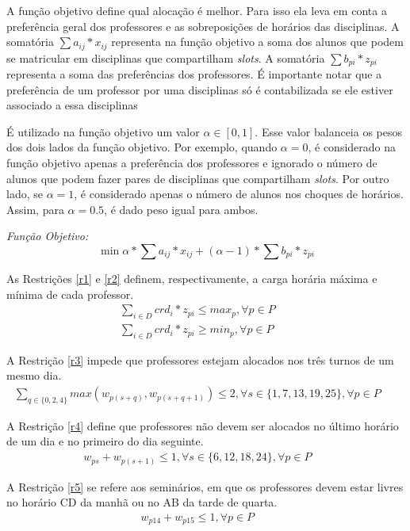 A função objetivo define qual alocação é melhor. Para isso ela leva em conta a preferência geral dos professores e as sobreposições de horários das disciplinas. A somatória $\sum a_{ij} * x_{ij}$ representa na função objetivo a soma dos alunos que podem se matricular em disciplinas que compartilham \textit{slots}. A somatória $\sum b_{pi} * z_{pi}$ representa a soma das preferências dos professores. É importante notar que a preferência de um professor por uma disciplinas só é contabilizada se ele estiver associado a essa disciplinas

É utilizado na função objetivo um valor $\alpha\in[0,1]$. Esse valor balanceia os pesos dos dois lados da função objetivo. Por exemplo, quando $\alpha = 0$, é considerado na função objetivo apenas a preferência dos professores e ignorado o número de alunos que podem fazer pares de disciplinas que compartilham \textit{slots}. Por outro lado, se $\alpha = 1$, é considerado apenas o número de alunos nos choques de horários. Assim, para $\alpha = 0.5$, é dado peso igual para ambos.

\emph{Função Objetivo:}
$$
\min{\alpha * \sum a_{ij} * x_{ij} + (\alpha-1) * \sum b_{pi} * z_{pi}}
$$

As Restrições \ref{r1} e \ref{r2} definem, respectivamente, a carga horária máxima e mínima de cada professor.
\begin{eqnarray}
\label{r1}
\sum_{i\in{D}}^{}{crd_i * z_{pi}} \le max_p, \forall{p}\in{P} &&\\
\label{r2}
\sum_{i\in{D}}^{}{crd_i * z_{pi}} \ge min_p, \forall{p}\in{P} &&
\end{eqnarray}

A Restrição \ref{r3} impede que professores estejam alocados nos três turnos de um mesmo dia.
\begin{eqnarray}
\label{r3}
\sum_{q\in\{{0,2,4}\}}^{}{max(w_{p(s+q)}, w_{p(s+q+1)})}  \leq 2, \forall{s}\in{\{1,7,13,19,25\}}, \forall{p}\in{P}  &&
\end{eqnarray}

A Restrição \ref{r4} define que professores não devem ser alocados no último horário de um dia e no primeiro do dia seguinte.
\begin{eqnarray}
\label{r4}
w_{ps} + w_{p(s+1)}  \leq 1, \forall{s}\in{\{6, 12, 18, 24\}}, \forall{p}\in{P}  &&
\end{eqnarray}

A Restrição \ref{r5} se refere aos seminários, em que os professores devem estar livres no horário CD da manhã ou no AB da tarde de quarta.
\begin{eqnarray}
\label{r5}
w_{p14} + w_{p15} \leq 1, \forall{p\in{P}} &&
\end{eqnarray}

